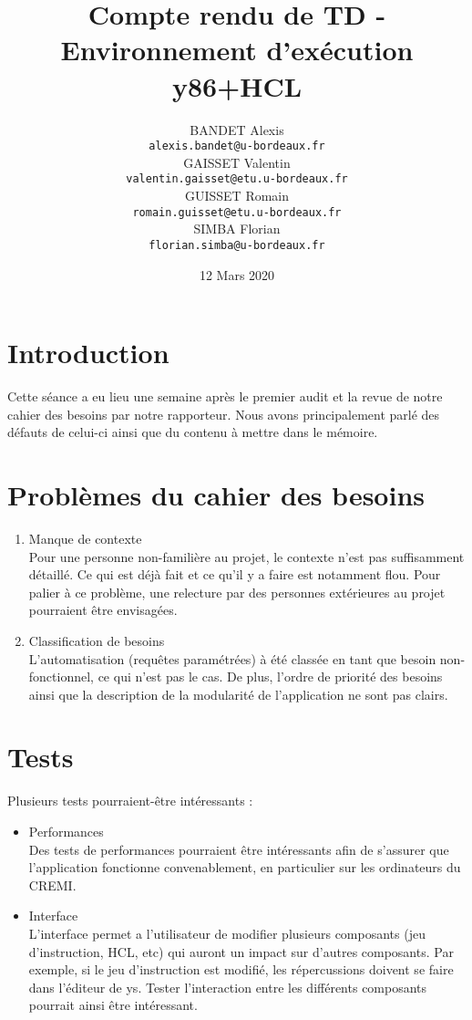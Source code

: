 \documentclass[french]{article}
\title{Compte rendu de TD - Environnement d'exécution y86+HCL}
\author{
    BANDET Alexis \\
    \texttt{alexis.bandet@u-bordeaux.fr} \\
    GAISSET Valentin \\
    \texttt{valentin.gaisset@etu.u-bordeaux.fr} \\
    GUISSET Romain \\
    \texttt{romain.guisset@etu.u-bordeaux.fr} \\
    SIMBA Florian \\
    \texttt{florian.simba@u-bordeaux.fr} \\
}
\date{12 Mars 2020}
\begin{document}
\maketitle

\newpage

\section{Introduction}

Cette séance a eu lieu une semaine après le premier audit et la revue de notre cahier des besoins par notre rapporteur. Nous avons principalement parlé des défauts de celui-ci ainsi que du contenu à mettre dans le mémoire.

\section{Problèmes du cahier des besoins}

\begin{enumerate}
    \item Manque de contexte\\
Pour une personne non-familière au projet, le contexte n'est pas suffisamment détaillé. Ce qui est déjà fait et ce qu'il y a faire est notamment flou. Pour palier à ce problème, une relecture par des personnes extérieures au projet pourraient être envisagées.

    \item Classification de besoins\\
L'automatisation (requêtes paramétrées) à été classée en tant que besoin non-fonctionnel, ce qui n'est pas le cas. De plus, l'ordre de priorité des besoins ainsi que la description de la modularité de l'application ne sont pas clairs. 

\end{enumerate}

\section{Tests}

Plusieurs tests pourraient-être intéressants :

\begin{itemize}
    \item Performances\\
Des tests de performances pourraient être intéressants afin de s'assurer que l'application fonctionne convenablement, en particulier sur les ordinateurs du CREMI.

    \item Interface\\
L'interface permet a l'utilisateur de modifier plusieurs composants (jeu d'instruction, HCL, etc) qui auront un impact sur d'autres composants. Par exemple, si le jeu d'instruction est modifié, les répercussions doivent se faire dans l'éditeur de ys. Tester l'interaction entre les différents composants pourrait ainsi être intéressant.
\end{itemize}{}
\end{document}
